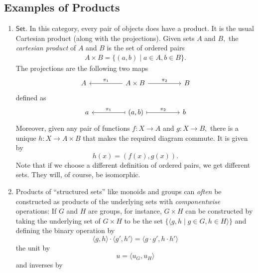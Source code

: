 \documentclass[11pt,leqno,landscape,semhelv]{seminar}
\numberwithin{equation}{section}
\theoremstyle{definition}
\numberwithin{thm}{section}
\numberwithin{equation}{section}
\begin{document}
\subsection{Examples of Products}
\begin{enumerate}
	\item $\mathsf{Set}.$ In this category, every pair of objects does have a product. It is the usual Cartesian product (along with the projections). Given sets $A$ and $B,$ the \emph{cartesian product} of $A$ and $B$ is the set of ordered pairs
	\begin{align*} 
		A \times B = \{(a, b) \mid a \in A, b \in B\}.
	\end{align*}
	The projections are the following two maps
	\begin{equation*} 
		\begin{tikzcd}
			A && A \times B \arrow[ll, "\pi_1"'] \arrow[rr, "\pi_2"] && B
		\end{tikzcd}
	\end{equation*}
	defined as
	\begin{equation*} 
		\begin{tikzcd}
			a && (a, b) \arrow[ll, maps to, "\pi_1"'] \arrow[rr, maps to, "\pi_2"] && b
		\end{tikzcd}
	\end{equation*}
	Moreover, given any pair of functions $f:X\to A$ and $g:X\to B,$ there is a unique $h:X\to A\times B$ that makes the required diagram commute. It is given by
	\begin{equation*} 
		h(x) = (f(x), g(x)).
	\end{equation*}
	Note that if we choose a different definition of ordered pairs, we get different sets. They will, of course, be isomorphic.
	\item Products of ``structured sets'' like monoids and groups can \emph{often} be constructed as products of the underlying sets with \emph{componentwise} operations: If $G$ and $H$ are groups, for instance, $G\times H$ can be constructed by taking the underlying set of $G \times H$ to be the set $\{\langle g, h \mid g \in G, h \in H\rangle\}$ and defining the binary operation by
	\begin{equation*} 
		\langle g, h\rangle\cdot\langle g', h'\rangle = \langle g\cdot g', h\cdot h'\rangle
	\end{equation*}
	the unit by
	\begin{equation*} 
		u = \langle u_G, u_H\rangle
	\end{equation*}
	and inverses by
	\begin{equation*} 

\end{equation*}
\end{enumerate}
\end{document}
